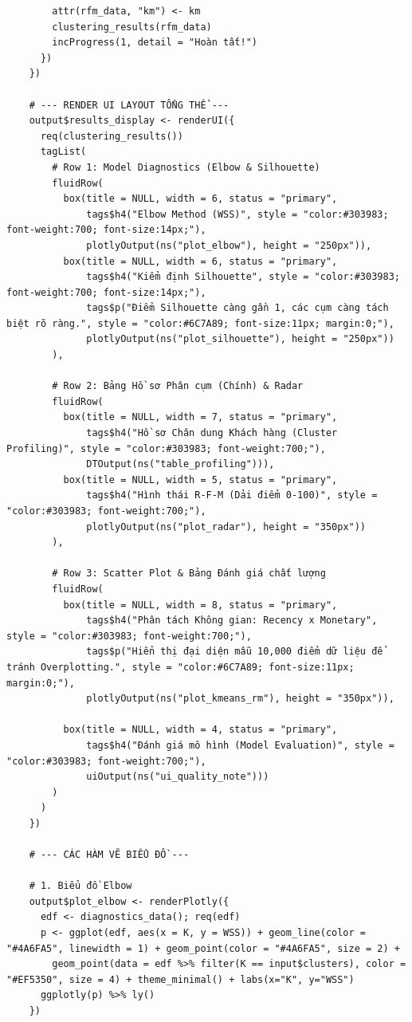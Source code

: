 \documentclass[12pt, a4paper]{article}
\begin{document}
\begin{lstlisting}
        attr(rfm_data, "km") <- km
        clustering_results(rfm_data)
        incProgress(1, detail = "Hoàn tất!")
      })
    })
    
    # --- RENDER UI LAYOUT TỔNG THỂ ---
    output$results_display <- renderUI({
      req(clustering_results())
      tagList(
        # Row 1: Model Diagnostics (Elbow & Silhouette)
        fluidRow(
          box(title = NULL, width = 6, status = "primary",
              tags$h4("Elbow Method (WSS)", style = "color:#303983; font-weight:700; font-size:14px;"),
              plotlyOutput(ns("plot_elbow"), height = "250px")),
          box(title = NULL, width = 6, status = "primary",
              tags$h4("Kiểm định Silhouette", style = "color:#303983; font-weight:700; font-size:14px;"),
              tags$p("Điểm Silhouette càng gần 1, các cụm càng tách biệt rõ ràng.", style = "color:#6C7A89; font-size:11px; margin:0;"),
              plotlyOutput(ns("plot_silhouette"), height = "250px"))
        ),
        
        # Row 2: Bảng Hồ sơ Phân cụm (Chính) & Radar
        fluidRow(
          box(title = NULL, width = 7, status = "primary",
              tags$h4("Hồ sơ Chân dung Khách hàng (Cluster Profiling)", style = "color:#303983; font-weight:700;"),
              DTOutput(ns("table_profiling"))),
          box(title = NULL, width = 5, status = "primary",
              tags$h4("Hình thái R-F-M (Dải điểm 0-100)", style = "color:#303983; font-weight:700;"),
              plotlyOutput(ns("plot_radar"), height = "350px"))
        ),
        
        # Row 3: Scatter Plot & Bảng Đánh giá chất lượng
        fluidRow(
          box(title = NULL, width = 8, status = "primary",
              tags$h4("Phân tách Không gian: Recency x Monetary", style = "color:#303983; font-weight:700;"),
              tags$p("Hiển thị đại diện mẫu 10,000 điểm dữ liệu để tránh Overplotting.", style = "color:#6C7A89; font-size:11px; margin:0;"),
              plotlyOutput(ns("plot_kmeans_rm"), height = "350px")),
          
          box(title = NULL, width = 4, status = "primary",
              tags$h4("Đánh giá mô hình (Model Evaluation)", style = "color:#303983; font-weight:700;"),
              uiOutput(ns("ui_quality_note")))
        )
      )
    })
    
    # --- CÁC HÀM VẼ BIỂU ĐỒ ---
    
    # 1. Biểu đồ Elbow
    output$plot_elbow <- renderPlotly({
      edf <- diagnostics_data(); req(edf)
      p <- ggplot(edf, aes(x = K, y = WSS)) + geom_line(color = "#4A6FA5", linewidth = 1) + geom_point(color = "#4A6FA5", size = 2) +
        geom_point(data = edf %>% filter(K == input$clusters), color = "#EF5350", size = 4) + theme_minimal() + labs(x="K", y="WSS")
      ggplotly(p) %>% ly()
    })
    

\end{lstlisting}
\end{document}
